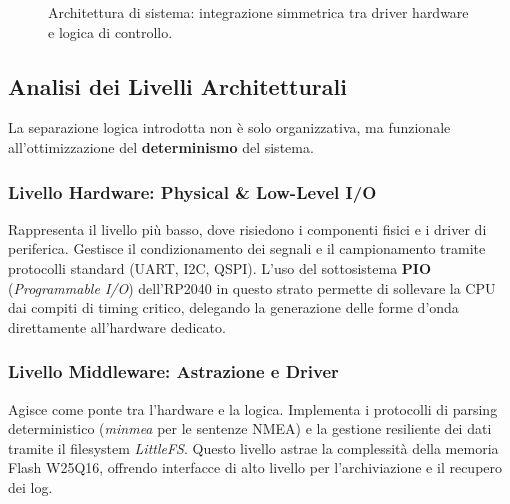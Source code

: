 \begin{figure}[H]
{
}
\caption{Architettura di sistema: integrazione simmetrica tra driver hardware e logica di controllo.}
\label{fig:system_architecture}
\end{figure}

\subsection{Analisi dei Livelli Architetturali}

La separazione logica introdotta non è solo organizzativa, ma funzionale all'ottimizzazione del \textbf{determinismo} del sistema.

\subsubsection*{Livello Hardware: Physical \& Low-Level I/O}
Rappresenta il livello più basso, dove risiedono i componenti fisici e i driver di periferica. Gestisce il condizionamento dei segnali e il campionamento tramite protocolli standard (UART, I2C, QSPI). L'uso del sottosistema \textbf{PIO} (\textit{Programmable I/O}) dell'RP2040 in questo strato permette di sollevare la CPU dai compiti di timing critico, delegando la generazione delle forme d'onda direttamente all'hardware dedicato.

\subsubsection*{Livello Middleware: Astrazione e Driver}
Agisce come ponte tra l'hardware e la logica. Implementa i protocolli di parsing deterministico (\textit{minmea} per le sentenze NMEA) e la gestione resiliente dei dati tramite il filesystem \textit{LittleFS}. Questo livello astrae la complessità della memoria Flash W25Q16, offrendo interfacce di alto livello per l'archiviazione e il recupero dei log.

